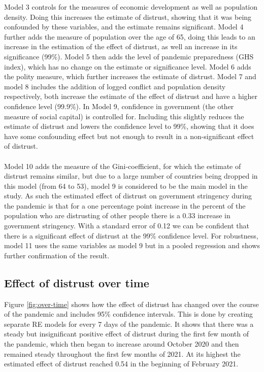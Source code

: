 \documentclass[
  11pt,
]{article}
\begin{document}
Model 3 controls for the measures of economic development as well as population density. Doing this increases the estimate of distrust, showing that it was being confounded by these variables, and the estimate remains significant. Model 4 further adds the measure of population over the age of 65, doing this leads to an increase in the estimation of the effect of distrust, as well an increase in its significance (99\%). Model 5 then adds the level of pandemic preparedness (GHS index), which has no change on the estimate or significance level. Model 6 adds the polity measure, which further increases the estimate of distrust. Model 7 and model 8 includes the addition of logged conflict and population density respectively, both increase the estimate of the effect of distrust and have a higher confidence level (99.9\%). In Model 9, confidence in government (the other measure of social capital) is controlled for. Including this slightly reduces the estimate of distrust and lowers the confidence level to 99\%, showing that it does have some confounding effect but not enough to result in a non-significant effect of distrust.\\
~\\
Model 10 adds the measure of the Gini-coefficient, for which the estimate of distrust remains similar, but due to a large number of countries being dropped in this model (from 64 to 53), model 9 is considered to be the main model in the study. As such the estimated effect of distrust on government stringency during the pandemic is that for a one percentage point increase in the percent of the population who are distrusting of other people there is a 0.33 increase in government stringency. With a standard error of 0.12 we can be confident that there is a significant effect of distrust at the 99\% confidence level. For robustness, model 11 uses the same variables as model 9 but in a pooled regression and shows further confirmation of the result.\\

\hypertarget{effect-of-distrust-over-time}{%
\subsection{Effect of distrust over time}\label{effect-of-distrust-over-time}}

Figure \ref{fig:over-time} shows how the effect of distrust has changed over the course of the pandemic and includes 95\% confidence intervals. This is done by creating separate RE models for every 7 days of the pandemic. It shows that there was a steady but insignificant positive effect of distrust during the first few month of the pandemic, which then began to increase around October 2020 and then remained steady throughout the first few months of 2021. At its highest the estimated effect of distrust reached 0.54 in the beginning of February 2021.\\
\end{document}
